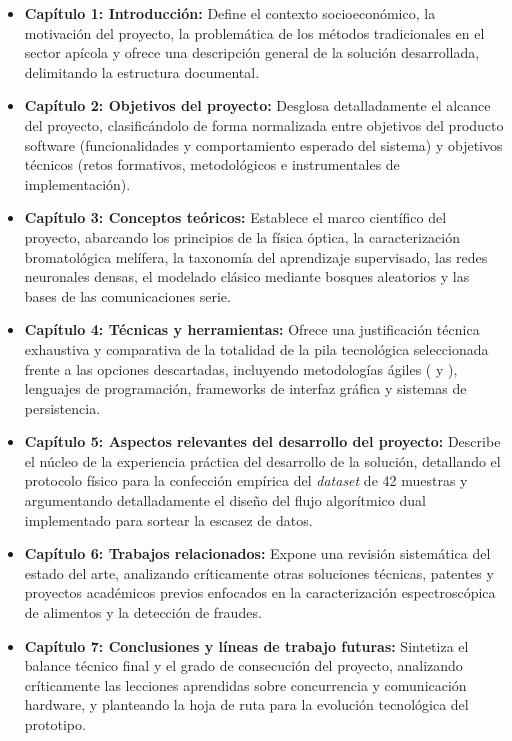 \begin{itemize}
    \item \textbf{Capítulo 1: Introducción:} Define el contexto socioeconómico, la motivación del proyecto, la problemática de los métodos tradicionales en el sector apícola y ofrece una descripción general de la solución  desarrollada, delimitando la estructura documental.
    \item \textbf{Capítulo 2: Objetivos del proyecto:} Desglosa detalladamente el alcance del proyecto, clasificándolo de forma normalizada entre objetivos del producto software (funcionalidades y comportamiento esperado del sistema) y objetivos técnicos (retos formativos, metodológicos e instrumentales de implementación).
    \item \textbf{Capítulo 3: Conceptos teóricos:} Establece el marco científico del proyecto, abarcando los principios de la física óptica, la caracterización bromatológica melífera, la taxonomía del aprendizaje supervisado, las redes neuronales densas, el modelado clásico mediante bosques aleatorios y las bases de las comunicaciones serie.
    \item \textbf{Capítulo 4: Técnicas y herramientas:} Ofrece una justificación técnica exhaustiva y comparativa de la totalidad de la pila tecnológica seleccionada frente a las opciones descartadas, incluyendo metodologías ágiles ( y ), lenguajes de programación, frameworks de interfaz gráfica y sistemas de persistencia.
    \item \textbf{Capítulo 5: Aspectos relevantes del desarrollo del proyecto:} Describe el núcleo de la experiencia práctica del desarrollo de la solución, detallando el protocolo físico para la confección empírica del \textit{dataset} de 42 muestras y argumentando detalladamente el diseño del flujo algorítmico dual implementado para sortear la escasez de datos.
    \item \textbf{Capítulo 6: Trabajos relacionados:} Expone una revisión sistemática del estado del arte, analizando críticamente otras soluciones técnicas, patentes y proyectos académicos previos enfocados en la caracterización espectroscópica de alimentos y la detección de fraudes.
    \item \textbf{Capítulo 7: Conclusiones y líneas de trabajo futuras:} Sintetiza el balance técnico final y el grado de consecución del proyecto, analizando críticamente las lecciones aprendidas sobre concurrencia y comunicación hardware, y planteando la hoja de ruta para la evolución tecnológica del prototipo.
\end{itemize}

